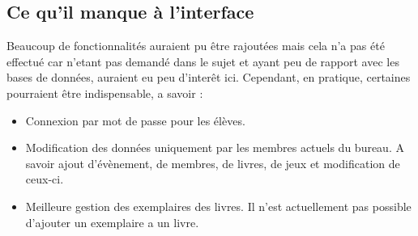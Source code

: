 \documentclass[a4paper, 11pt]{article}
\begin{document}
\subsection{Ce qu'il manque à l'interface}
Beaucoup de fonctionnalités auraient pu être rajoutées mais cela n'a pas été effectué car n'etant pas demandé dans le sujet et ayant peu de rapport avec les bases de données, auraient eu peu d'interêt ici. Cependant, en pratique, certaines pourraient être indispensable, a savoir :
\begin{itemize}
\item Connexion par mot de passe pour les élèves. 
\item Modification des données uniquement par les membres actuels du bureau. A savoir ajout d'évènement, de membres, de livres, de jeux et modification de ceux-ci.
\item Meilleure gestion des exemplaires des livres. Il n'est actuellement pas possible d'ajouter un exemplaire a un livre.
\end{itemize}
\end{document}
